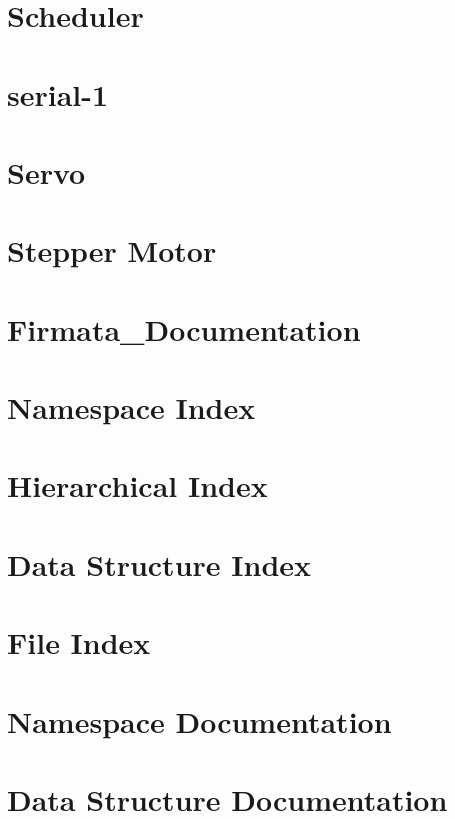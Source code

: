 \let\mypdfximage\pdfximage\def\pdfximage{\immediate\mypdfximage}\documentclass[twoside]{book}
\newcommand{\+}{\discretionary{\mbox{\scriptsize$\hookleftarrow$}}{}{}}
\begin{document}
\chapter{Scheduler}
\label{md_protocol_scheduler}

\chapter{serial-\/1}
\label{md_protocol_serial-1_80}

\chapter{Servo}
\label{md_protocol_servos}

\chapter{Stepper Motor}
\label{md_protocol_stepper-legacy}

\chapter{Firmata\+\_\+\+Documentation}
\label{md__r_e_a_d_m_e}

\chapter{Namespace Index}

\chapter{Hierarchical Index}

\chapter{Data Structure Index}

\chapter{File Index}

\chapter{Namespace Documentation}

\chapter{Data Structure Documentation}












\end{document}

